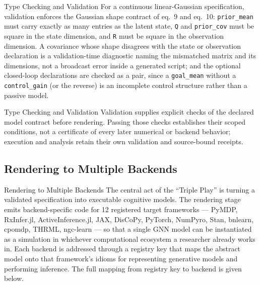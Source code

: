 \documentclass[
  ignorenonframetext,
]{beamer}
\begin{document}
\begin{frame}{Type Checking and Validation}
For a continuous linear-Gaussian specification, validation enforces the
Gaussian shape contract of eq.~9 and
eq.~10: \texttt{prior\_mean} must carry exactly as many
entries as the latent state, \texttt{Q} and \texttt{prior\_cov} must be
square in the state dimension, and \texttt{R} must be square in the
observation dimension. A covariance whose shape disagrees with the state
or observation declaration is a validation-time diagnostic naming the
mismatched matrix and its dimensions, not a broadcast error inside a
generated script; and the optional closed-loop declarations are checked
as a pair, since a \texttt{goal\_mean} without a \texttt{control\_gain}
(or the reverse) is an incomplete control structure rather than a
passive model.

\end{frame}

\begin{frame}{Type Checking and Validation}
Validation supplies explicit checks of the declared model contract
before rendering. Passing those checks establishes their scoped
conditions, not a certificate of every later numerical or backend
behavior; execution and analysis retain their own validation and
source-bound receipts.
\end{frame}

\subsection{Rendering to Multiple
Backends}\label{rendering-to-multiple-backends}

\begin{frame}{Rendering to Multiple Backends}
The central act of the ``Triple Play'' is turning a validated
specification into executable cognitive models. The rendering stage
emits backend-specific code for 12 registered target frameworks ---
PyMDP, RxInfer.jl, ActiveInference.jl, JAX, DisCoPy, PyTorch, NumPyro,
Stan, bnlearn, cpomdp, THRML, ngc-learn --- so that a single GNN model
can be instantiated as a simulation in whichever computational ecosystem
a researcher already works in. Each backend is addressed through a
registry key that maps the abstract model onto that framework's idioms
for representing generative models and performing inference. The full
mapping from registry key to backend is given below.

\end{frame}
\end{document}
